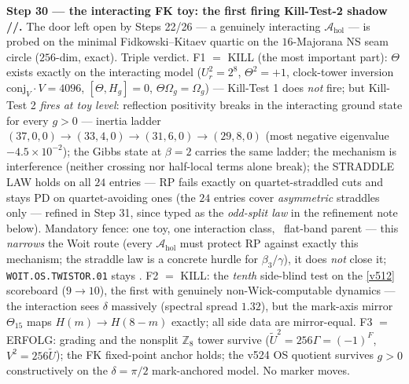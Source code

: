 \documentclass[11pt,a4paper]{article}
\newcommand{\Z}{\mathbb{Z}}
\theoremstyle{definition}
\begin{document}
\par\smallskip\noindent\textbf{Step 30 --- the interacting FK toy: the first firing
Kill-Test-2 shadow \mE/\mC/\mO.} The door left open by Steps 22/26 --- a genuinely
interacting $\mathcal A_{\mathrm{hol}}$ --- is probed on the minimal Fidkowski--Kitaev
quartic on the $16$-Majorana NS seam circle ($256$-dim, exact). Triple verdict. F1 $=$
KILL (the most important part): $\Theta$ exists exactly on the interacting model
($U_r^2=2^8$, $\Theta^2=+1$, clock-tower inversion $\mathrm{conj}_V\cdot V=4096$,
$[\Theta,H_g]=0$, $\Theta\Omega_g=\Omega_g$) --- Kill-Test 1 does \emph{not} fire; but
Kill-Test 2 \emph{fires at toy level}: reflection positivity breaks in the interacting
ground state for every $g>0$ --- inertia ladder $(37,0,0)\to(33,4,0)\to(31,6,0)\to
(29,8,0)$ (most negative eigenvalue $-4.5\times10^{-2}$); the Gibbs state at $\beta=2$
carries the same ladder; the mechanism is interference (neither crossing nor half-local
terms alone break); the STRADDLE LAW holds on all $24$ entries --- RP fails exactly on
quartet-straddled cuts and stays PD on quartet-avoiding ones (the $24$ entries cover
\emph{asymmetric} straddles only --- refined in Step 31, since typed as the \emph{odd-split
law} in the refinement note below). Mandatory fence: one toy,
one interaction class, \mC\ flat-band parent --- this \emph{narrows} the Woit route
(every $\mathcal A_{\mathrm{hol}}$ must protect RP against exactly this mechanism; the
straddle law is a concrete hurdle for $\beta_3/\gamma$), it does \emph{not} close it;
\texttt{WOIT.OS.TWISTOR.01} stays \mO. F2 $=$ KILL: the \emph{tenth} side-blind test on
the \vref{v512} scoreboard ($9\to10$), the first with genuinely non-Wick-computable
dynamics --- the interaction sees $\delta$ massively (spectral spread $1.32$), but the
mark-axis mirror $\Theta_{15}$ maps $H(m)\to H(8-m)$ exactly; all side data are
mirror-equal. F3 $=$ ERFOLG: grading and the nonsplit $\Z_8$ tower survive
($\tilde U^2=256\Gamma=(-1)^F$, $V^2=256\tilde U$); the FK fixed-point anchor holds; the
v524 OS quotient survives $g>0$ constructively on the $\delta=\pi/2$ mark-anchored model.
No marker moves.
\end{document}
